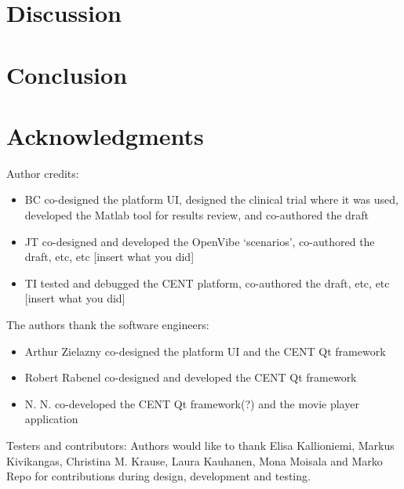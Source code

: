 \documentclass[fleqn,10pt]{wlpeerj}
\begin{document}
\section{Discussion}

\lipsum[10] %





\section{Conclusion}

\lipsum[11] %








\section*{Acknowledgments}

Author credits:
\begin{itemize}
	\item BC co-designed the platform UI, designed the clinical trial where it was used, developed the Matlab tool for results review, and co-authored the draft
	
	\item JT co-designed and developed the OpenVibe ‘scenarios’, co-authored the draft, etc, etc [insert what you did]
	
	\item TI tested and debugged the CENT platform, co-authored the draft, etc, etc [insert what you did]
	
\end{itemize}

The authors thank the software engineers:
\begin{itemize}
	\item Arthur Zielazny co-designed the platform UI and the CENT Qt framework

	\item Robert Rabenel co-designed and developed the CENT Qt framework

	\item N. N. co-developed the CENT Qt framework(?) and the movie player application

\end{itemize}

Testers and contributors:
Authors would like to thank Elisa Kallioniemi, Markus Kivikangas, Christina M. Krause, Laura Kauhanen, Mona Moisala and Marko Repo for contributions during design, development and testing.
\end{document}
